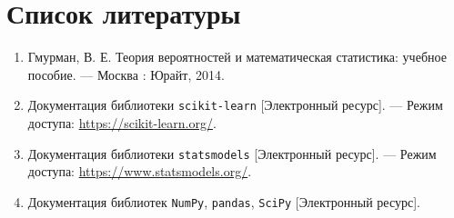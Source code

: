 \section*{Список литературы}

\begin{enumerate}
    \item Гмурман, В. Е. Теория вероятностей и математическая статистика: учебное пособие. --- Москва : Юрайт, 2014.
    \item Документация библиотеки \texttt{scikit-learn} [Электронный ресурс]. --- Режим доступа: \url{https://scikit-learn.org/}.
    \item Документация библиотеки \texttt{statsmodels} [Электронный ресурс]. --- Режим доступа: \url{https://www.statsmodels.org/}.
    \item Документация библиотек \texttt{NumPy}, \texttt{pandas}, \texttt{SciPy} [Электронный ресурс].
\end{enumerate}

